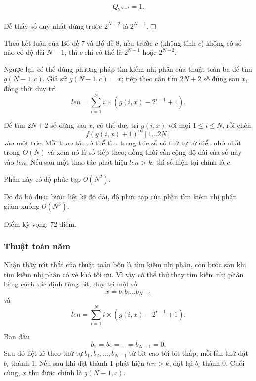 \documentclass[11pt]{article}
\newcommand{\proofbox}{\ensuremath{\vcenter{\hrule height 0.45pt
  \hbox{\vrule width 0.45pt height 6pt\kern 6pt\vrule width 0.45pt}
  \hrule height 0.45pt}}}
\begin{document}
\paragraph{}
\[
Q_{2^{N-2}}=1.
\]

\paragraph{}
Dễ thấy số duy nhất đứng trước \(2^{N-2}\) là \(2^{N-1}\). \proofbox

Theo kết luận của Bổ đề 7 và Bổ đề 8, nếu trước \(c\) (không tính \(c\)) không
có số nào có độ dài \(N-1\), thì \(c\) chỉ có thể là \(2^{N-1}\) hoặc
\(2^{N-2}\).

Ngược lại, có thể dùng phương pháp tìm kiếm nhị phân của thuật toán ba để tìm
\(g(N-1,c)\). Giả sử \(g(N-1,c)=x\); tiếp theo cần tìm \(2N+2\) số đứng sau
\(x\), đồng thời duy trì
\[
\mathit{len}=\sum_{i=1}^{N}i\times\left(g(i,x)-2^{i-1}+1\right).
\]

Để tìm \(2N+2\) số đứng sau \(x\), có thể duy trì \(g(i,x)\) với mọi
\(1\le i\le N\), rồi chèn
\[
f(g(i,x)+1)^\infty[1\ldots 2N]
\]
vào một trie. Mỗi thao tác có thể tìm trong trie số có thứ tự từ điển nhỏ nhất
trong \(O(N)\) và xem nó là số tiếp theo; đồng thời cần cộng độ dài của số này
vào \(\mathit{len}\). Nếu sau một thao tác phát hiện \(\mathit{len}>k\), thì
số hiện tại chính là \(c\).

Phần này có độ phức tạp \(O(N^2)\).

Do đã bỏ được bước liệt kê độ dài, độ phức tạp của phần tìm kiếm nhị phân giảm
xuống \(O(N^3)\).

Điểm kỳ vọng: 72 điểm.

\subsubsection{Thuật toán năm}

Nhận thấy nút thắt của thuật toán bốn là tìm kiếm nhị phân, còn bước sau khi
tìm kiếm nhị phân có vẻ khó tối ưu. Vì vậy có thể thử thay tìm kiếm nhị phân
bằng cách xác định từng bit, duy trì một số
\[
x=b_1b_2\ldots b_{N-1}
\]
và
\[
\mathit{len}=\sum_{i=1}^{N}i\times\left(g(i,x)-2^{i-1}+1\right).
\]

Ban đầu
\[
b_1=b_2=\cdots=b_{N-1}=0.
\]
Sau đó liệt kê theo thứ tự \(b_1,b_2,\ldots,b_{N-1}\) từ bit cao tới bit thấp;
mỗi lần thử đặt \(b_i\) thành \(1\). Nếu sau khi đặt thành \(1\) phát hiện
\(\mathit{len}>k\), đặt lại \(b_i\) thành \(0\). Cuối cùng, \(x\) thu được
chính là \(g(N-1,c)\).
\end{document}

